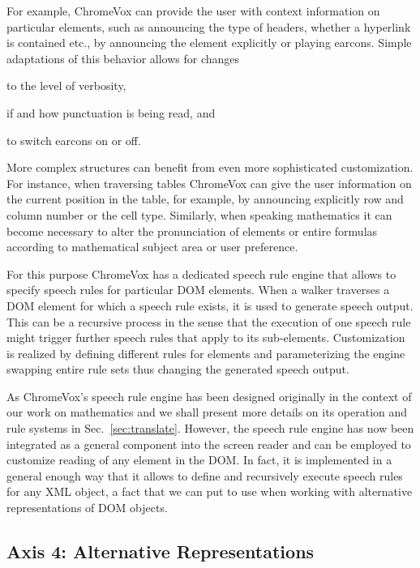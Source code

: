 \documentclass{sig-alternate}
\begin{document}
For example, ChromeVox can provide the user with context information on
particular elements, such as announcing the type of headers, whether a hyperlink
is contained etc., by announcing the element explicitly or playing
earcons. Simple adaptations of this behavior allows for changes
\begin{inparaenum}[(a)]
\item to the level of verbosity,
\item if and how punctuation is being read, and
\item to switch earcons on or off.
\end{inparaenum}

More complex structures can benefit from even more sophisticated customization.
For instance, when traversing tables ChromeVox can give the user information on
the current position in the table, for example, by announcing explicitly row and
column number or the cell type. Similarly, when speaking mathematics it can become
necessary to alter the pronunciation of elements or entire formulas according to
mathematical subject area or user preference.

For this purpose ChromeVox has a dedicated speech rule engine that allows to
specify speech rules for particular DOM elements. When a walker traverses a DOM
element for which a speech rule exists, it is used to generate speech
output. This can be a recursive process in the sense that the execution of one
speech rule might trigger further speech rules that apply to its sub-elements.
Customization is realized by defining different rules for elements and
parameterizing the engine swapping entire rule sets thus changing the generated
speech output.

As ChromeVox's speech rule engine has been designed originally in the context of
our work on mathematics and we shall present more details on
its operation and rule systems in Sec.~\ref{sec:translate}. However, the speech
rule engine has now been integrated as a general component into the screen
reader and can be employed to customize reading of any element in the DOM. In
fact, it is implemented in a general enough way that it allows to define and
recursively execute speech rules for any XML object, a fact that we can put to
use when working with alternative representations of DOM objects.


\subsection{Axis 4: Alternative Representations}
\label{sec:ax4}
\end{document}
